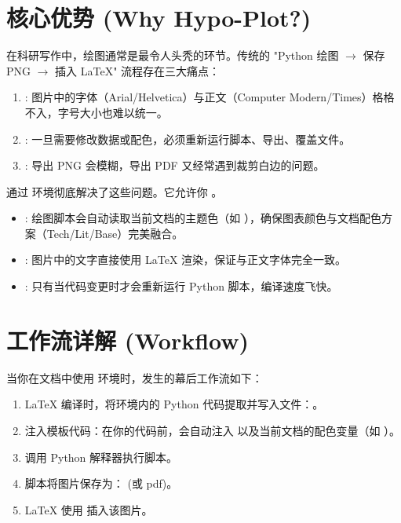 \documentclass[
    outputdir=build,
    colorscheme=Tech,
    shorthand=true,
    code=true,
    fontset=lit
]{Hypo-Note}
\begin{document}
\section{核心优势 (Why Hypo-Plot?)}

在科研写作中，绘图通常是最令人头秃的环节。传统的 "Python 绘图 $\to$ 保存 PNG $\to$ 插入 LaTeX" 流程存在三大痛点：
\begin{enumerate}
    \item {}: 图片中的字体（Arial/Helvetica）与正文（Computer Modern/Times）格格不入，字号大小也难以统一。
    \item {}: 一旦需要修改数据或配色，必须重新运行脚本、导出、覆盖文件。
    \item {}: 导出 PNG 会模糊，导出 PDF 又经常遇到裁剪白边的问题。
\end{enumerate}

 通过  环境彻底解决了这些问题。它允许你 。

\begin{itemize}
    \item {}: 绘图脚本会自动读取当前文档的主题色（如 ），确保图表颜色与文档配色方案（Tech/Lit/Base）完美融合。
    \item {}: 图片中的文字直接使用 LaTeX 渲染，保证与正文字体完全一致。
    \item {}: 只有当代码变更时才会重新运行 Python 脚本，编译速度飞快。
\end{itemize}

\section{工作流详解 (Workflow)}

当你在文档中使用  环境时，发生的幕后工作流如下：

\begin{enumerate}
    \item LaTeX 编译时，将环境内的 Python 代码提取并写入文件：。
    \item 注入模板代码：在你的代码前，会自动注入  以及当前文档的配色变量（如 ）。
    \item 调用 Python 解释器执行脚本。
    \item 脚本将图片保存为： (或 pdf)。
    \item LaTeX 使用  插入该图片。
\end{enumerate}
\end{document}
